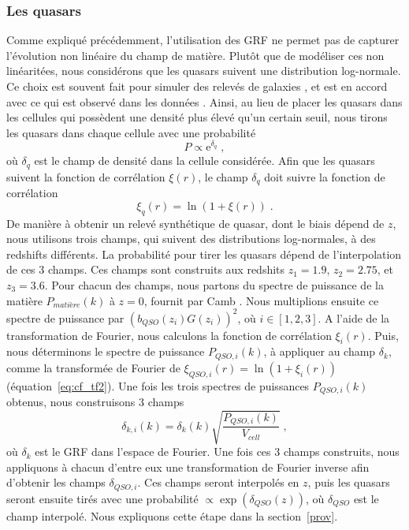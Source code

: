 \documentclass[11pt, twoside, a4paper, openright]{report}
\begin{document}
\subsubsection{Les quasars}
Comme expliqué précédemment, l'utilisation des GRF ne permet pas de capturer l'évolution non linéaire du champ de matière. Plutôt que de modéliser ces non linéaritées, nous considérons que les quasars suivent une distribution log-normale.
Ce choix est souvent fait pour simuler des relevés de galaxies \citep{agrawal_generating_2017}, et est en accord avec ce qui est observé dans les données \citep{Clerkin2016}.
Ainsi, au lieu de placer les quasars dans les cellules qui possèdent une densité plus élevé qu'un certain seuil, nous tirons les quasars dans chaque cellule avec une probabilité
\begin{equation}
  P \propto \mathrm{e}^{\delta_q} \; ,
\end{equation}
où $\delta_q$ est le champ de densité dans la cellule considérée.
Afin que les quasars suivent la fonction de corrélation $\xi(r)$, le champ $\delta_q$ doit suivre la fonction de corrélation
\begin{equation}
  \label{eq:lognormal}
  \xi_q(r) = \ln(1+\xi(r)) \; .
\end{equation}
De manière à obtenir un relevé synthétique de quasar, dont le biais dépend de $z$, nous utilisons trois champs, qui suivent des distributions log-normales, à des redshifts différents. La probabilité pour tirer les quasars dépend de l'interpolation de ces 3 champs. Ces champs sont construits aux redshits $z_1 = \num{1.9}$, $z_2 = \num{2.75}$, et $z_3 = \num{3.6}$. Pour chacun des champs, nous partons du spectre de puissance de la matière $P_{matière}(k)$ à $z=0$, fournit par Camb \citep{Lewis1999}. Nous multiplions ensuite ce spectre de puissance par $(b_{QSO}(z_i) G(z_i))^2$, où $i \in [1, 2, 3]$. A l'aide de la transformation de Fourier, nous calculons la fonction de corrélation $\xi_{i}(r)$. Puis, nous déterminons le spectre de puissance $P_{QSO,i}(k)$, à appliquer au champ $\delta_k$, comme la transformée de Fourier de $\xi_{QSO,i}(r) = \ln(1+\xi_i(r))$ (équation~\ref{eq:cf_tf2}).
Une fois les trois spectres de puissances $P_{QSO,i}(k)$ obtenus, nous construisons 3 champs
\begin{equation}
  \delta_{k,i}(k)  = \delta_k(k) \sqrt{\frac{P_{QSO,i}(k)}{V_{cell}}} \; ,
\end{equation}
où $\delta_k$ est le GRF dans l'espace de Fourier. Une fois ces 3 champs construits, nous appliquons à chacun d'entre eux une transformation de Fourier inverse afin d'obtenir les champs $\delta_{QSO, i}$. Ces champs seront interpolés en $z$, puis les quasars seront ensuite tirés avec une probabilité $\propto \exp(\delta_{QSO}(z))$, où $\delta_{QSO}$ est le champ interpolé. Nous expliquons cette étape dans la section~\ref{prov}.
\end{document}
